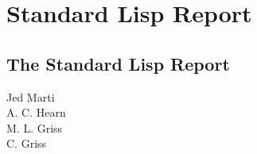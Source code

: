 \part{Standard Lisp Report}
\setcounter{examplectr}{0}

\chapter{The Standard Lisp Report}
\label{SL}

{\footnotesize
\begin{center}
Jed Marti \\ A. C. Hearn \\ M. L. Griss \\ C. Griss
\end{center}
}


\newlength{\argwidth}                  %
\setlength{\argwidth}{4in}
\newlength{\dewidth}
\setlength{\dewidth}{4.5in}             %

\newcommand{\de}[4]
{\vspace{.25in} \noindent
\begin{minipage}[t]{\textwidth} \index{#1} {\f{#1}}{#2}\hfill{\em #3} \\
\hspace*{.25in}\begin{minipage}[t]{\dewidth} #4 \end{minipage}
\end{minipage} }

\newcommand{\variable}[4]
{\vspace{.25in} \noindent
\begin{minipage}[t]{\textwidth} \index{#1 (#3)} {\bf #1} = #2 \hfill {\em #3}
 \\
\hspace*{.25in} \ \begin{minipage}[t]{\dewidth} #4 \end{minipage}
\end{minipage}}

\newcommand{\errormessage}[1]
{\vspace{.1in} \noindent {\tt #1} \\ \vspace{.1in}}


